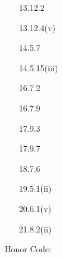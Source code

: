 \documentclass[11pt]{article}
\begin{document}
\begin{enumerate}
    \item[13.12.2]

    \hrulefill

    \item[13.12.4(v)]

    \hrulefill

    \item[14.5.7]

    \hrulefill

    \item[14.5.15(iii)]

    \hrulefill

    \item[16.7.2]

    \hrulefill

    \item[16.7.9]

    \hrulefill

    \item[17.9.3]

    \hrulefill

    \item[17.9.7]

    \hrulefill

    \item[18.7.6]

    \hrulefill

    \item[19.5.1(ii)]

    \hrulefill

    \item[20.6.1(v)]

    \hrulefill

    \item[21.8.2(ii)]

    \hrulefill

\end{enumerate}
Honor Code: \vspace*{7em}
\end{document}
